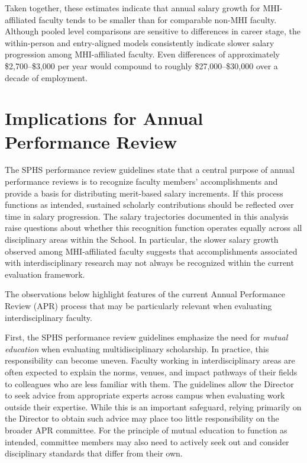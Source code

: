 \documentclass{article}
\begin{document}
Taken together, these estimates indicate that annual salary growth for MHI-affiliated faculty tends to be smaller than for comparable non-MHI faculty. Although pooled level comparisons are sensitive to differences in career stage, the within-person and entry-aligned models consistently indicate slower salary progression among MHI-affiliated faculty. Even differences of approximately \$2{,}700--\$3{,}000 per year would compound to roughly \$27{,}000--\$30{,}000 over a decade of employment.

\section*{Implications for Annual Performance Review}

The SPHS performance review guidelines state that a central purpose of annual performance reviews is to recognize faculty members' accomplishments and provide a basis for distributing merit-based salary increments. If this process functions as intended, sustained scholarly contributions should be reflected over time in salary progression. The salary trajectories documented in this analysis raise questions about whether this recognition function operates equally across all disciplinary areas within the School. In particular, the slower salary growth observed among MHI-affiliated faculty suggests that accomplishments associated with interdisciplinary research may not always be recognized within the current evaluation framework.

The observations below highlight features of the current Annual Performance Review (APR) process that may be particularly relevant when evaluating interdisciplinary faculty.

First, the SPHS performance review guidelines emphasize the need for \emph{mutual education} when evaluating multidisciplinary scholarship. In practice, this responsibility can become uneven. Faculty working in interdisciplinary areas are often expected to explain the norms, venues, and impact pathways of their fields to colleagues who are less familiar with them. The guidelines allow the Director to seek advice from appropriate experts across campus when evaluating work outside their expertise. While this is an important safeguard, relying primarily on the Director to obtain such advice may place too little responsibility on the broader APR committee. For the principle of mutual education to function as intended, committee members may also need to actively seek out and consider disciplinary standards that differ from their own.
\end{document}
